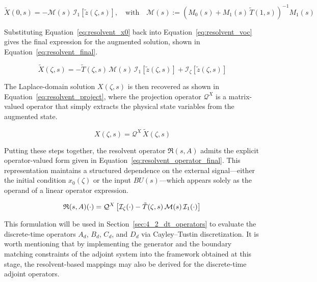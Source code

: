\begin{equation} \label{eq:resolvent_x0}
    \tilde{X}(0, s) = -\mathcal{M}(s)\, \mathcal{I}_1[\tilde{z}(\zeta, s)], \quad \text{with} \quad \mathcal{M}(s) := \left( M_0(s) + M_1(s)\, \tilde{T}(1, s) \right)^{-1} M_1(s)
\end{equation}

Substituting Equation~\eqref{eq:resolvent_x0} back into Equation~\eqref{eq:resolvent_voc} gives the final expression for the augmented solution, shown in Equation~\eqref{eq:resolvent_final}. 

\begin{equation} \label{eq:resolvent_final}
\tilde{X}(\zeta, s) = -\tilde{T}(\zeta, s)\, \mathcal{M}(s)\, \mathcal{I}_1[\tilde{z}(\zeta, s)] + \mathcal{I}_\zeta[\tilde{z}(\zeta, s)]
\end{equation}

The Laplace-domain solution $X(\zeta, s)$ is then recovered as shown in Equation~\eqref{eq:resolvent_project}, where the projection operator $\mathcal{Q}^X$ is a matrix-valued operator that simply extracts the physical state variables from the augmented state.

\begin{equation} \label{eq:resolvent_project}
    X(\zeta, s) = \mathcal{Q}^X\, \tilde{X}(\zeta, s)
\end{equation}

Putting these steps together, the resolvent operator $\mathfrak{R}(s, A)$ admits the explicit operator-valued form given in Equation~\eqref{eq:resolvent_operator_final}. This representation maintains a structured dependence on the external signal—either the initial condition $x_0(\zeta)$ or the input $B U(s)$—which appears solely as the operand of a linear operator expression.

\begin{equation} \label{eq:resolvent_operator_final}
    \mathfrak{R}(s, A) (\cdot) = \mathcal{Q}^X \left[ \mathcal{I}_\zeta (\cdot) - \tilde{T}(\zeta, s)\, \mathcal{M}(s)\, \mathcal{I}_1 (\cdot)  \right] \\
\end{equation}

This formulation will be used in Section~\ref{sec:4_2_dt_operators} to evaluate the discrete-time operators $A_d$, $B_d$, $C_d$, and $D_d$ via Cayley--Tustin discretization. It is worth mentioning that by implementing the generator and the boundary matching constraints of the adjoint system into the framework obtained at this stage, the resolvent-based mappings may also be derived for the discrete-time adjoint operators.

